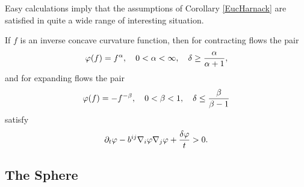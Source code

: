 \documentclass{amsart}
\begin{document}
Easy calculations imply that the assumptions of Corollary \ref{EucHarnack} are satisfied in quite a wide range of interesting situation.

\begin{corollary}\label{HarnackEucCor}
 If $f$ is an inverse concave curvature function, then for contracting flows the pair
$$\varphi(f)=f^{\alpha},\quad 0<\alpha<\infty, \quad \delta\geq \frac{\alpha}{\alpha+1},$$
and for expanding flows the pair
$$\varphi(f)=-f^{-\beta}, \quad 0<\beta<1,\quad \delta\leq \frac{\beta}{\beta-1}$$
satisfy $$\partial_t \varphi-b^{ij}\nabla_i\varphi\nabla_j\varphi+\frac{\delta\varphi}{t}>0.$$
\end{corollary}

\subsection{The Sphere}
\end{document}
